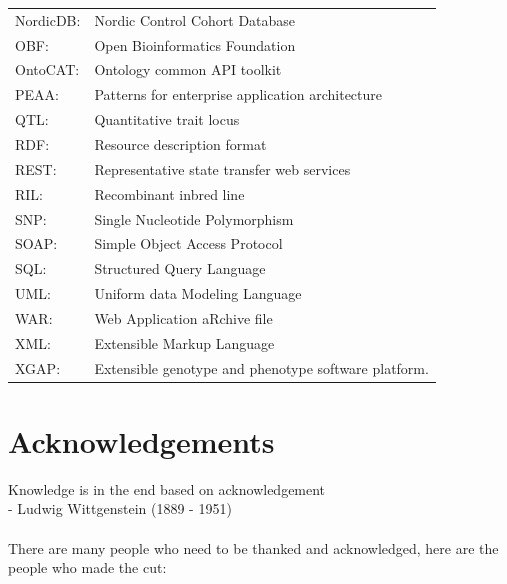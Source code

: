 {\begin{tabular}{ l l }
NordicDB:    & Nordic Control Cohort Database\\
OBF:         & Open Bioinformatics Foundation\\
OntoCAT:     & Ontology common API toolkit\\
PEAA:        & Patterns for enterprise application architecture\\
QTL:         & Quantitative trait locus\\
RDF:         & Resource description format\\
REST:        & Representative state transfer web services\\
RIL:         & Recombinant inbred line \\
SNP:         & Single Nucleotide Polymorphism\\
SOAP:        & Simple Object Access Protocol\\
SQL:         & Structured Query Language\\
UML:         & Uniform data Modeling Language\\
WAR:         & Web Application aRchive file\\
XML:         & Extensible Markup Language\\
XGAP:        & Extensible genotype and phenotype software platform. 
\end{tabular}
}
\newpage

\section*{Acknowledgements}
Knowledge is in the end based on acknowledgement\\
- Ludwig Wittgenstein (1889 - 1951)\\\\

There are many people who need to be thanked and acknowledged, 
here are the people who made the cut:

